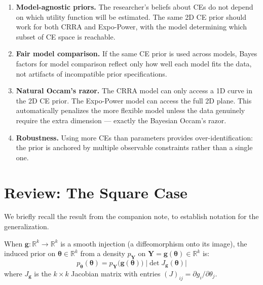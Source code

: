 \documentclass[11pt,a4paper]{article}
\theoremstyle{definition}
\newcommand{\btheta}{\boldsymbol{\theta}}
\begin{document}
\begin{enumerate}
    \item \textbf{Model-agnostic priors.} The researcher's beliefs about CEs
    do not depend on which utility function will be estimated. The same 2D
    CE prior should work for both CRRA and Expo-Power, with the model
    determining which subset of CE space is reachable.

    \item \textbf{Fair model comparison.} If the same CE prior is used
    across models, Bayes factors for model comparison reflect only how well
    each model fits the data, not artifacts of incompatible prior
    specifications.

    \item \textbf{Natural Occam's razor.} The CRRA model can only access a
    1D curve in the 2D CE prior. The Expo-Power model can access the full 2D
    plane. This automatically penalizes the more flexible model unless the
    data genuinely require the extra dimension --- exactly the Bayesian
    Occam's razor.

    \item \textbf{Robustness.} Using more CEs than parameters provides
    over-identification: the prior is anchored by multiple observable
    constraints rather than a single one.
\end{enumerate}


\section{Review: The Square Case}
\label{sec:square}

We briefly recall the result from the companion note, to establish notation
for the generalization.

When $\mathbf{g}: \mathbb{R}^k \to \mathbb{R}^k$ is a smooth injection (a
diffeomorphism onto its image), the induced prior on $\btheta \in \mathbb{R}^k$
from a density $p_{\mathbf{Y}}$ on $\mathbf{Y} = \mathbf{g}(\btheta) \in
\mathbb{R}^k$ is:
\begin{equation}
    \label{eq:square}
    p_{\btheta}(\btheta) = p_{\mathbf{Y}}\!\big(\mathbf{g}(\btheta)\big) \;
    \big|\!\det J_{\mathbf{g}}(\btheta)\big|
\end{equation}
where $J_{\mathbf{g}}$ is the $k \times k$ Jacobian matrix with entries
$(J)_{ij} = \partial g_i / \partial \theta_j$.
\end{document}
